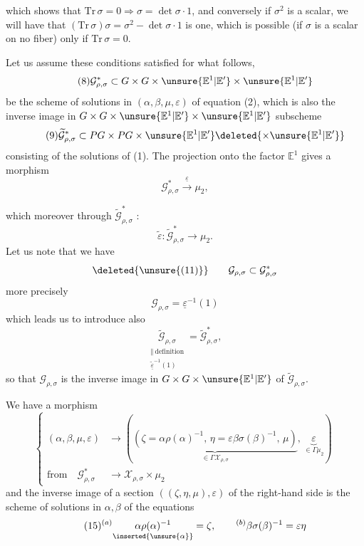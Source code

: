 
which shows that $\mathrm{Tr}\,\sigma=0\Longrightarrow\sigma=\det\sigma\cdot1$,
and conversely if $\sigma^2$ is a scalar, we will have that
$(\mathrm{Tr}\,\sigma)\sigma=\sigma^2-\det\sigma\cdot1$ is one,
which is possible (if $\sigma$ is  a scalar on no
fiber) only if $\mathrm{Tr}\,\sigma=0$.

Let us assume these conditions satisfied for what follows,
\[
\tag{8}
\mathcal G^*_{\rho,\sigma}\subset
G\times G\times\unsure{\mathbb E^1|\mathbb E'}
\times\unsure{\mathbb E^1|\mathbb E'}
\]
be the scheme of solutions in $(\alpha,\beta,\mu,\varepsilon)$ of equation (2),
which is also the inverse image in
$G\times G\times\unsure{\mathbb E^1|\mathbb E'}
\times\unsure{\mathbb E^1|\mathbb E'}$  subscheme
\[
\tag{9}
\widetilde{\mathcal G}^*_{\rho,\sigma}\subset
PG\times PG\times\unsure{\mathbb E^1|\mathbb E'}
\deleted{\times\unsure{\mathbb E^1|\mathbb E'}}
\]
consisting of the solutions \inserted{$(\alpha,\beta,\mu)$} of (1).
The projection onto the  factor
$\mathbb E^1$ gives a morphism
\[
\tag{10}
\mathcal G^*_{\rho,\sigma}\xrightarrow{\underline{\varepsilon}}\mu_2,
\]

which moreover  through $\widetilde{\mathcal G}^{*}_{\rho,\sigma}$ :
\[
\tag{11}
\widetilde{\varepsilon}:\widetilde{\mathcal G}^{*}_{\rho,\sigma}\longrightarrow\mu_2.
\]
Let us note that we have
\[
\deleted{\unsure{(11)}}\qquad
\mathcal G_{\rho,\sigma}\subset\mathcal G^{*}_{\rho,\sigma}
\]
more precisely
\[
\tag{12}
\mathcal G_{\rho,\sigma}=\underline{\varepsilon}^{-1}(1)
\]
which leads us to introduce also
\[
\tag{13}
\underset{\substack{\Vert\ \text{definition}\\
\underline{\widetilde{\varepsilon}}^{-1}(1)}}{\widetilde{\mathcal G}_{\rho,\sigma}}
=\widetilde{\mathcal G}^{*}_{\rho,\sigma},
\]
so that $\mathcal G_{\rho,\sigma}$ is the inverse image in
$G\times G\times\unsure{\mathbb E^1|\mathbb E'}$ of $\widetilde{\mathcal G}_{\rho,\sigma}$.

We have a morphism
\[
\tag{14}
\left\{\begin{aligned}
(\alpha,\beta,\mu,\varepsilon)&\longrightarrow
\left(\underbrace{(\zeta=\alpha\rho(\alpha)^{-1},\,
\eta=\varepsilon\beta\sigma(\beta)^{-1},\,\mu)}_{\in\Gamma\mathcal X_{\rho,\sigma}},\,
\underbrace{\varepsilon}_{\in\Gamma\mu_2}\right)\\
\text{from}\quad\mathcal G^{*}_{\rho,\sigma}&\longrightarrow\mathcal X_{\rho,\sigma}\times\mu_2
\end{aligned}\right.
\]
and the inverse image of a section $((\zeta,\eta,\mu),\varepsilon)$ of the right-hand side is the
scheme of solutions in $\alpha,\beta$ of the equations
\[
\tag{15}
{}^{(a)}\underset{\inserted{\unsure{\alpha}}}{\alpha\rho(\alpha)^{-1}}=\zeta,
\qquad {}^{(b)}\beta\sigma(\beta)^{-1}=\varepsilon\eta
\]

